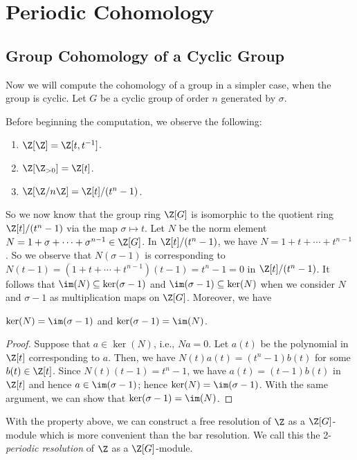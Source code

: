 \newpage
\section{Periodic Cohomology}
\subsection{Group Cohomology of a Cyclic Group}
Now we will compute the cohomology of a group in a simpler case, when the group is cyclic.
Let $G$ be a cyclic group of order $n$ generated by $\sigma$.

Before beginning the computation, we observe the following:
\begin{remark}
    \noindent
    \begin{enumerate}
        \item $\Z[\Z] = \Z[t, t^{-1}]$.
        \item $\Z[\Z_{>0}] = \Z[t]$.
        \item $\Z[\Z/n\Z] = \Z[t]/(t^n-1)$.
    \end{enumerate}
\end{remark}
So we now know that the group ring $\Z[G]$ is isomorphic to the quotient ring $\Z[t]/(t^n-1)$
via the map $\sigma \mapsto t$.
Let $N$ be the norm element $N = 1 + \sigma + \cdots + \sigma^{n-1} \in \Z[G]$.
In $\Z[t]/(t^n-1)$, we have $N = 1 + t + \cdots + t^{n-1}$.
So we observe that $N(\sigma-1)$ is corresponding to $N(t-1) = (1+t+\cdots+t^{n-1})(t-1) = t^n - 1 = 0$ in $\Z[t]/(t^n-1)$.
It follows that $\im(N) \subseteq \ker(\sigma-1)$
and $\im(\sigma-1) \subseteq \ker(N)$
when we consider $N$ and $\sigma-1$ as multiplication maps on $\Z[G]$.
Moreover, we have
\begin{proposition}
    $\ker(N) = \im(\sigma-1)$ and $\ker(\sigma-1) = \im(N)$.
\end{proposition}
\begin{proof}
    Suppose that $a \in \ker(N)$, i.e., $Na = 0$.
    Let $a(t)$ be the polynomial in $\Z[t]$ corresponding to $a$.
    Then, we have $N(t)a(t) = (t^n-1)b(t)$ for some $b(t) \in \Z[t]$.
    Since $N(t)(t-1) = t^n-1$, we have $a(t) = (t-1)b(t)$ in $\Z[t]$
    and hence $a \in \im(\sigma-1)$; hence $\ker(N) = \im(\sigma-1)$.
    With the same argument, we can show that $\ker(\sigma-1) = \im(N)$.
\end{proof}

With the property above, we can construct a free resolution of $\Z$ as a $\Z[G]$-module
which is more convenient than the bar resolution.
We call this the 2-\textit{periodic resolution} of $\Z$ as a $\Z[G]$-module.

